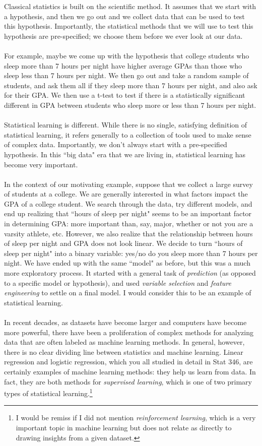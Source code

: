 \documentclass[titlepage,10pt]{scrartcl}
\begin{document}
Classical statistics is built on the scientific method. It assumes that we start with a hypothesis, and then we go out and we collect data that can be used to test this hypothesis. Importantly, the statistical methods that we will use to test this hypothesis are pre-specified; we choose them before we ever look at our data. \\
\\
For example, maybe we come up with the hypothesis that college students who sleep more than 7 hours per night have higher average GPAs than those who sleep less than 7 hours per night. We then go out and take a random sample of students, and ask them all if they sleep more than 7 hours per night, and also ask for their GPA. We then use a t-test to test if there is a statistically significant different in GPA between students who sleep more or less than 7 hours per night. \\
\\
Statistical learning is different. While there is no single, satisfying definition of statistical learning, it refers generally to a collection of tools used to make sense of complex data. Importantly, we don't always start with a pre-specified hypothesis. In this ``big data" era that we are living in, statistical learning has become very important. \\
\\
In the context of our motivating example, suppose that we collect a large survey of students at a college. We are generally interested in what factors impact the GPA of a college student. We search through the data, try different models, and end up realizing that ``hours of sleep per night" seems to be an important factor in determining GPA: more important than, say, major, whether or not you are a varsity athlete, etc. However, we also realize that the relationship between hours of sleep per night and GPA does not look linear. We decide to turn ``hours of sleep per night" into a binary variable: yes/no do you sleep more than 7 hours per night. We have ended up with the same ``model" as before, but this was a much more exploratory process. It started with a general task of \emph{prediction} (as opposed to a specific model or hypothesis), and used \emph{variable selection} and \emph{feature engineering} to settle on a final model. I would consider this to be an example of statistical learning. \\
\\
In recent decades, as datasets have become larger and computers have become more powerful, there have been a proliferation of complex methods for analyzing data that are often labeled as machine learning methods. In general, however, there is no clear dividing line between statistics and machine learning. Linear regression and logistic regression, which you all studied in detail in Stat 346, are certainly examples of machine learning methods: they help us learn from data. In fact, they are both methods for \emph{supervised learning}, which is one of two primary types of statistical learning.\footnote{I would be remiss if I did not mention \emph{reinforcement learning}, which is a very important topic in machine learning but does not relate as directly to drawing insights from a given dataset.}  
\end{document}
